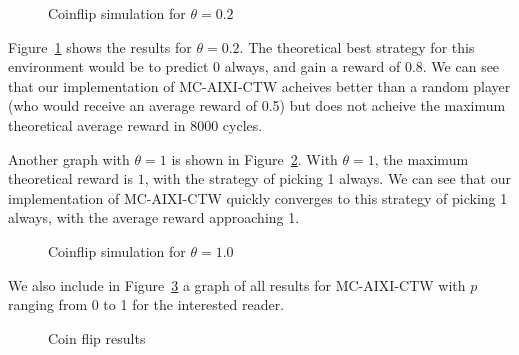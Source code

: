 \documentclass[pdftex,twoside,a4paper]{report}
\newcommand{\mac}{MC-AIXI-CTW}
\begin{document}
\begin{figure}[h]
\centering
\caption{Coinflip simulation for $\theta=0.2$}
\label{fig:coin_0_2}
\end{figure}
	
Figure~\ref{fig:coin_0_2} shows the results for $\theta=0.2$. The theoretical best strategy for this environment would be to predict $0$ always, and gain a reward of $0.8$. We can see that our implementation of \mac{} acheives better than a random player (who would receive an average reward of 0.5) but does not acheive the maximum theoretical average reward in 8000 cycles.

Another graph with $\theta = 1$ is shown in Figure~\ref{fig:coin_1_0}. With $\theta = 1$, the maximum theoretical reward is $1$, with the strategy of picking 1 always. We can see that our implementation of \mac{} quickly converges to this strategy of picking 1 always, with the average reward approaching 1.

\begin{figure}
\centering
\caption{Coinflip simulation for $\theta=1.0$}
\label{fig:coin_1_0}
\end{figure}

We also include in Figure~\ref{fig:coinflip_results} a graph of all results for \mac{} with $p$ ranging from 0 to 1 for the interested reader.

\begin{figure}[h]
 \begin{center}
 \end{center}
 \caption{Coin flip results}
 \label{fig:coinflip_results}
\end{figure}
\end{document}
